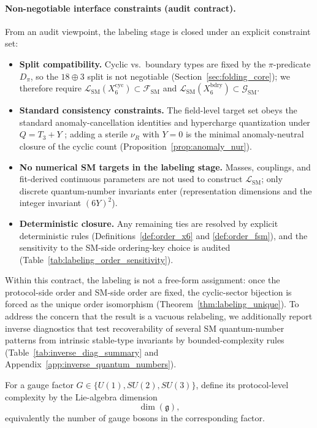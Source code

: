 \paragraph{Non-negotiable interface constraints (audit contract).}
From an audit viewpoint, the labeling stage is closed under an explicit constraint set:
\begin{itemize}
\item \textbf{Split compatibility.} Cyclic vs.\ boundary types are fixed by the $\pi$-predicate $D_\pi$, so the $18\oplus 3$ split is not negotiable (Section~\ref{sec:folding_core}); we therefore require $\mathcal{L}_{\mathrm{SM}}(X_6^{\mathrm{cyc}})\subset\mathcal{F}_{\mathrm{SM}}$ and $\mathcal{L}_{\mathrm{SM}}(X_6^{\mathrm{bdry}})\subset\mathcal{G}_{\mathrm{SM}}$.
\item \textbf{Standard consistency constraints.} The field-level target set obeys the standard anomaly-cancellation identities and hypercharge quantization under $Q=T_3+Y$ \cite{PeskinSchroeder1995,PDGRPP2024}; adding a sterile $\nu_R$ with $Y=0$ is the minimal anomaly-neutral closure of the cyclic count (Proposition~\ref{prop:anomaly_nur}).
\item \textbf{No numerical SM targets in the labeling stage.} Masses, couplings, and fit-derived continuous parameters are not used to construct $\mathcal{L}_{\mathrm{SM}}$; only discrete quantum-number invariants enter (representation dimensions and the integer invariant $(6Y)^2$).
\item \textbf{Deterministic closure.} Any remaining ties are resolved by explicit deterministic rules (Definitions~\ref{def:order_x6} and \ref{def:order_fsm}), and the sensitivity to the SM-side ordering-key choice is audited (Table~\ref{tab:labeling_order_sensitivity}).
\end{itemize}
Within this contract, the labeling is not a free-form assignment: once the protocol-side order and SM-side order are fixed, the cyclic-sector bijection is forced as the unique order isomorphism (Theorem~\ref{thm:labeling_unique}).
To address the concern that the result is a vacuous relabeling, we additionally report inverse diagnostics that test recoverability of several SM quantum-number patterns from intrinsic stable-type invariants by bounded-complexity rules (Table~\ref{tab:inverse_diag_summary} and Appendix~\ref{app:inverse_quantum_numbers}).

\begin{definition}\label{def:gauge_sector_complexity}
For a gauge factor $G\in\{U(1),SU(2),SU(3)\}$, define its protocol-level complexity by the Lie-algebra dimension
\[
\dim(\mathfrak{g}),
\]
equivalently the number of gauge bosons in the corresponding factor.
\end{definition}

